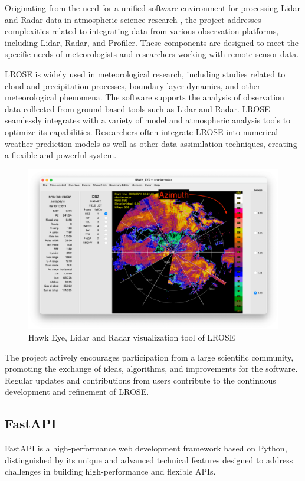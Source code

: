 Originating from the need for a unified software environment for processing
Lidar and Radar data in atmospheric science research \cite{lrose}, the project
addresses complexities related to integrating data from various observation
platforms, including Lidar, Radar, and Profiler. These components are designed
to meet the specific needs of meteorologists and researchers working with remote
sensor data.

LROSE is widely used in meteorological research, including studies related to
cloud and precipitation processes, boundary layer dynamics, and other
meteorological phenomena. The software supports the analysis of observation data
collected from ground-based tools such as Lidar and Radar. LROSE seamlessly
integrates with a variety of model and atmospheric analysis tools to optimize
its capabilities. Researchers often integrate LROSE into numerical weather
prediction models as well as other data assimilation techniques, creating a
flexible and powerful system.

\begin{figure}[H]
    \centering
    \includegraphics[width=0.8\linewidth]{Images/3.5-hawk-eye.png}
    \caption{Hawk Eye, Lidar and Radar visualization tool of LROSE}
    \label{fig:hawk-eye}
\end{figure}

The project actively encourages participation from a large scientific community,
promoting the exchange of ideas, algorithms, and improvements for the software.
Regular updates and contributions from users contribute to the continuous
development and refinement of LROSE.

\subsection{FastAPI}
FastAPI is a high-performance web development framework based on Python,
distinguished by its unique and advanced technical features designed to address
challenges in building high-performance and flexible APIs.

